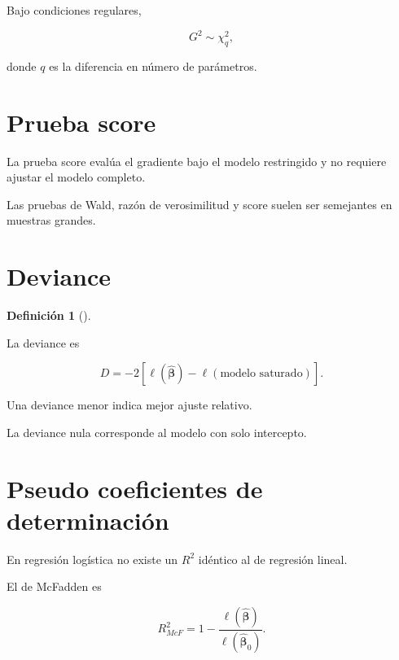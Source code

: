 \documentclass[
  spanish,
  10.5pt,
  letterpaper,
  DIV=11,
  numbers=noendperiod,
  oneside,
  open=any]{scrreprt}
\theoremstyle{definition}
\newtheorem{definition}{Definición}[chapter]
\theoremstyle{definition}
\theoremstyle{plain}
\theoremstyle{remark}
\begin{document}
Bajo condiciones regulares,

\[
G^2\sim\chi^2_q,
\]

donde \(q\) es la diferencia en número de parámetros.

\section*{Prueba score}\label{prueba-score}


La prueba score evalúa el gradiente bajo el modelo restringido y no
requiere ajustar el modelo completo.

Las pruebas de Wald, razón de verosimilitud y score suelen ser
semejantes en muestras grandes.

\section*{Deviance}\label{deviance}


\begin{definition}[]\protect\hypertarget{def-deviance-logistica}{}\label{def-deviance-logistica}

La deviance es

\[
D
=
-2
\left[
\ell(\widehat{\boldsymbol{\beta}})
-
\ell(\text{modelo saturado})
\right].
\]

\end{definition}

Una deviance menor indica mejor ajuste relativo.

La deviance nula corresponde al modelo con solo intercepto.

\section*{Pseudo coeficientes de
determinación}\label{pseudo-coeficientes-de-determinaciuxf3n}


En regresión logística no existe un \(R^2\) idéntico al de regresión
lineal.

El de McFadden es

\[
R^2_{McF}
=
1-
\frac{
\ell(\widehat{\boldsymbol{\beta}})
}{
\ell(\widehat{\boldsymbol{\beta}}_0)
}.
\]
\end{document}
